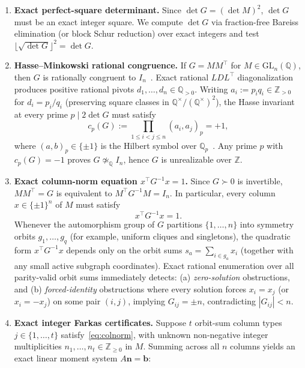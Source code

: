 \documentclass[11pt]{article}
\theoremstyle{remark}
\newcommand{\Z}{\mathbb{Z}}
\newcommand{\Q}{\mathbb{Q}}
\begin{document}
\begin{enumerate}[leftmargin=*,topsep=3pt,itemsep=2pt]
\item \textbf{Exact perfect-square determinant.} Since $\det G = (\det M)^2$, $\det G$ must be an exact integer square. We compute $\det G$ via fraction-free Bareiss elimination (or block Schur reduction) over exact integers and test $\lfloor\sqrt{\det G}\rfloor^2 = \det G$.
\item \textbf{Hasse--Minkowski rational congruence.} If $G = M M^\top$ for $M \in \mathrm{GL}_n(\Q)$, then $G$ is rationally congruent to $I_n$~\cite{serre1973}. Exact rational $LDL^\top$ diagonalization produces positive rational pivots $d_1, \dots, d_n \in \Q_{>0}$. Writing $a_i := p_i q_i \in \Z_{>0}$ for $d_i = p_i / q_i$ (preserving square classes in $\Q^\times / (\Q^\times)^2$), the Hasse invariant at every prime $p \mid 2\det G$ must satisfy
\begin{equation}\label{eq:hasse}
  c_p(G) := \prod_{1 \le i < j \le n} (a_i, a_j)_p = +1,
\end{equation}
where $(a, b)_p \in \{\pm 1\}$ is the Hilbert symbol over $\Q_p$~\cite[Ch.~III--IV]{serre1973}. Any prime $p$ with $c_p(G) = -1$ proves $G \not\simeq_\Q I_n$, hence $G$ is unrealizable over $\Z$.
\item \textbf{Exact column-norm equation $x^\top G^{-1} x = 1$.} Since $G \succ 0$ is invertible, $M M^\top = G$ is equivalent to $M^\top G^{-1} M = I_n$. In particular, every column $x \in \{\pm 1\}^n$ of $M$ must satisfy
\begin{equation}\label{eq:colnorm}
  x^\top G^{-1} x = 1.
\end{equation}
Whenever the automorphism group of $G$ partitions $\{1, \dots, n\}$ into symmetry orbits $g_1, \dots, g_q$ (for example, uniform cliques and singletons), the quadratic form $x^\top G^{-1} x$ depends only on the orbit sums $s_a = \sum_{i \in g_a} x_i$ (together with any small active subgraph coordinates). Exact rational enumeration over all parity-valid orbit sums immediately detects: (a) \emph{zero-solution} obstructions, and (b) \emph{forced-identity} obstructions where every solution forces $x_i = x_j$ (or $x_i = -x_j$) on some pair $(i, j)$, implying $G_{ij} = \pm n$, contradicting $|G_{ij}| < n$.
\item \textbf{Exact integer Farkas certificates.} Suppose $t$ orbit-sum column types $j \in \{1, \dots, t\}$ satisfy~\eqref{eq:colnorm}, with unknown non-negative integer multiplicities $n_1, \dots, n_t \in \Z_{\ge 0}$ in $M$. Summing across all $n$ columns yields an exact linear moment system $A \mathbf{n} = \mathbf{b}$:

\end{enumerate}
\end{document}
